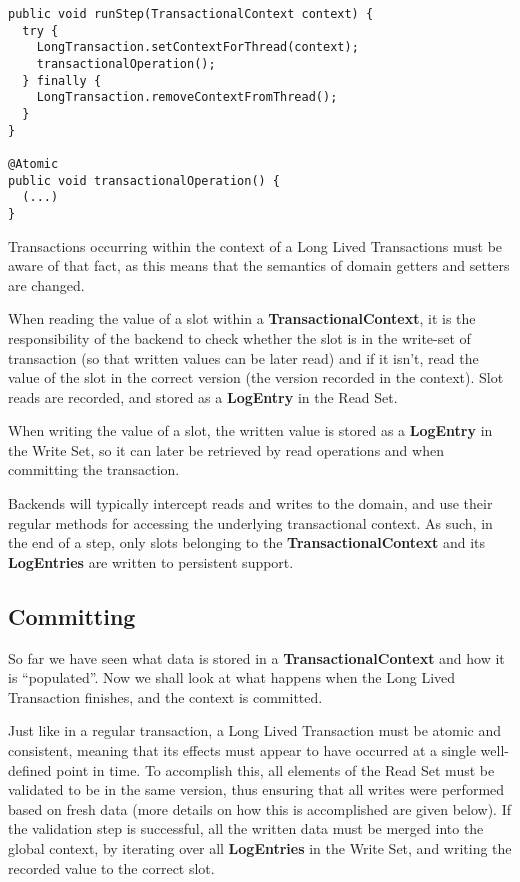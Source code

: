 \begin{lstlisting}[caption={Example of TransactionalContext usage},
  label={list:longTxBind}]
public void runStep(TransactionalContext context) {
  try {
    LongTransaction.setContextForThread(context);
    transactionalOperation();
  } finally {
    LongTransaction.removeContextFromThread();
  }
}

@Atomic
public void transactionalOperation() {
  (...)
}
\end{lstlisting}

Transactions occurring within the context of a Long Lived Transactions
must be aware of that fact, as this means that the semantics of domain
getters and setters are changed. 

When reading the value of a slot within a {\bf TransactionalContext},
it is the responsibility of the backend to check whether the slot is
in the write-set of transaction (so that written values can be later
read) and if it isn't, read the value of the slot in the correct
version (the version recorded in the context). Slot reads are
recorded, and stored as a {\bf LogEntry} in the Read Set.

When writing the value of a slot, the written value is stored as a
{\bf LogEntry} in the Write Set, so it can later be retrieved by read
operations and when committing the transaction.

Backends will typically intercept reads and writes to the domain, and
use their regular methods for accessing the underlying transactional
context. As such, in the end of a step, only slots belonging to the
{\bf TransactionalContext} and its {\bf LogEntries} are written to
persistent support.

\subsection{Committing}

So far we have seen what data is stored in a {\bf
  TransactionalContext} and how it is ``populated''. Now we shall look
at what happens when the Long Lived Transaction finishes, and the
context is committed.

Just like in a regular transaction, a Long Lived Transaction must be
atomic and consistent, meaning that its effects must appear to have
occurred at a single well-defined point in time. To accomplish this,
all elements of the Read Set must be validated to be in the same
version, thus ensuring that all writes were performed based on fresh
data (more details on how this is accomplished are given below). If
the validation step is successful, all the written data must be merged
into the global context, by iterating over all {\bf LogEntries} in the
Write Set, and writing the recorded value to the correct slot.

